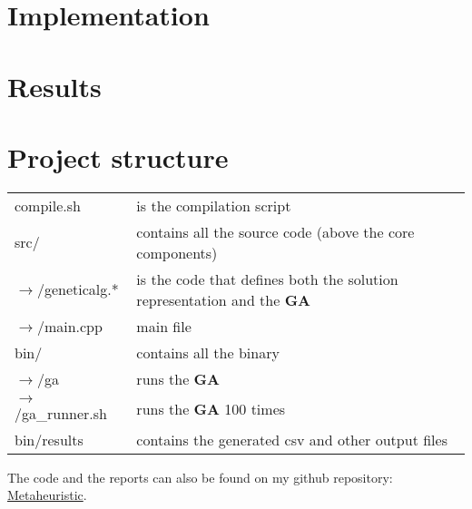 \documentclass{article}
\newcommand{\tmstrong}[1]{\textbf{#1}}
\begin{document}
\section{Implementation}

\section{Results}

\section{Project structure}

\begin{tabular}{ll}
  compile.sh & is the compilation script\\
  src/ & contains all the source code (above the core components)\\
  $\rightarrow$/geneticalg.* & is the code that defines both the solution
  representation and the {\tmstrong{GA}}\\
  $\rightarrow$/main.cpp & main file\\
  bin/ & contains all the binary\\
  $\rightarrow$/ga & runs the {\tmstrong{GA}}\\
  $\rightarrow$/ga\_runner.sh & runs the {\tmstrong{GA}} 100 times\\
  bin/results & contains the generated csv and other output files
\end{tabular}

The code and the reports can also be found on my github repository:
\href{https://github.com/Mandarancio/Metaheuristic}{Metaheuristic}.

\
\end{document}
